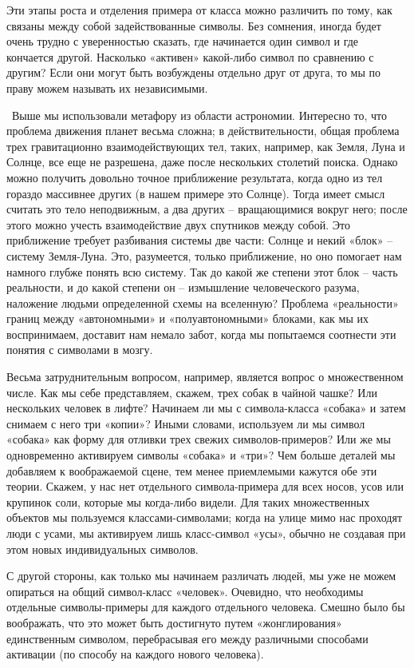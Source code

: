 \documentclass[../main.tex]{subfiles}
\begin{document}
Эти этапы роста и отделения примера от класса можно различить по тому, как связаны между собой задействованные символы. Без сомнения, иногда будет очень трудно с уверенностью сказать, где начинается один символ и где кончается другой. Насколько «активен» какой-либо символ по сравнению с другим? Если они могут быть возбуждены отдельно друг от друга, то мы по праву можем называть их независимыми.

~Выше мы использовали метафору из области астрономии. Интересно то, что проблема движения планет весьма сложна; в действительности, общая проблема трех гравитационно взаимодействующих тел, таких, например, как Земля, Луна и Солнце, все еще не разрешена, даже после нескольких столетий поиска. Однако можно получить довольно точное приближение результата, когда одно из тел гораздо массивнее других (в нашем примере это Солнце). Тогда имеет смысл считать это тело неподвижным, а два других \--- вращающимися вокруг него; после этого можно учесть взаимодействие двух спутников между собой. Это приближение требует разбивания системы две части: Солнце и некий «блок» \--- систему Земля-Луна. Это, разумеется, только приближение, но оно помогает нам намного глубже понять всю систему. Так до какой же степени этот блок \--- часть реальности, и до какой степени он \--- измышление человеческого разума, наложение людьми определенной схемы на вселенную? Проблема «реальности» границ между «автономными» и «полуавтономными» блоками, как мы их воспринимаем, доставит нам немало забот, когда мы попытаемся соотнести эти понятия с символами в мозгу.

Весьма затруднительным вопросом, например, является вопрос о множественном числе. Как мы себе представляем, скажем, трех собак в чайной чашке? Или нескольких человек в лифте? Начинаем ли мы с символа-класса «собака» и затем снимаем с него три «копии»? Иными словами, используем ли мы символ «собака» как форму для отливки трех свежих символов-примеров? Или же мы одновременно активируем символы «собака» и «три»? Чем больше деталей мы добавляем к воображаемой сцене, тем менее приемлемыми кажутся обе эти теории. Скажем, у нас нет отдельного символа-примера для всех носов, усов или крупинок соли, которые мы когда-либо видели. Для таких множественных объектов мы пользуемся классами-символами; когда на улице мимо нас проходят люди с усами, мы активируем лишь класс-символ «усы», обычно не создавая при этом новых индивидуальных символов.

С другой стороны, как только мы начинаем различать людей, мы уже не можем опираться на общий символ-класс «человек». Очевидно, что необходимы отдельные символы-примеры для каждого отдельного человека. Смешно было бы воображать, что это может быть достигнуто путем «жонглирования» единственным символом, перебрасывая его между различными способами активации (по способу на каждого нового человека).
\end{document}
